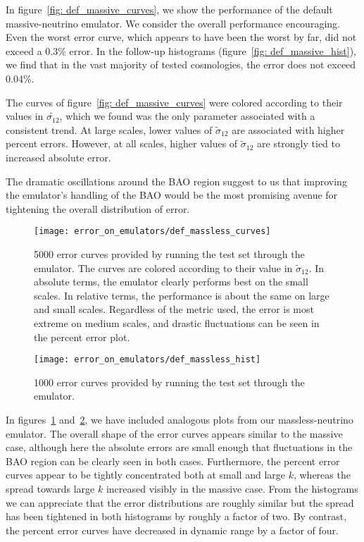 In figure~\ref{fig: def_massive_curves}, we 
show the performance of the default massive-neutrino emulator. We consider
the overall performance encouraging. Even the worst error curve, which
appears to have been the worst by far, did not exceed a 0.3\% error.
In the follow-up histograms (figure~\ref{fig: def_massive_hist}), we find
that in the vast majority of tested cosmologies, the error does not
exceed 0.04\%.

The curves of figure~\ref{fig: def_massive_curves} were colored according to
their values in $\tilde{\sigma_{12}}$, which we found was the only parameter
associated with a consistent trend. At large scales, lower values of
$\tilde{\sigma}_{12}$ are associated with higher percent errors. However, at
all scales, higher values of $\tilde{\sigma}_{12}$ are strongly tied to
increased absolute error.

The dramatic
oscillations around the BAO region suggest to us that improving the emulator's
handling of the BAO would be the most promising avenue for tightening the
overall distribution of error.

\begin{figure}[ht!]
  \centering
  \texttt{[image: error\_on\_emulators/def\_massless\_curves]}
  \caption[Default Massless Emulator Error Curves]{5000 error curves provided 
  by running the test set through the emulator. The curves are colored
  according to their value in $\tilde{\sigma}_{12}$.
  In absolute terms, the emulator
  clearly performs best on the small scales. In relative terms, the
  performance is about the same on large and small scales.
  Regardless of the metric used, the
  error is most extreme on medium scales, and drastic fluctuations can be seen 
  in the percent error plot.}
  \label{fig: def_massless_curves}
\end{figure}

\begin{figure}[ht!]
  \centering
  \texttt{[image: error\_on\_emulators/def\_massless\_hist]}
  \caption[Default Massless Emulator Error Histograms]{1000 error curves provided by running the test set through the emulator.}
  \label{fig: def_massless_hist}
\end{figure}

In figures~\ref{fig: def_massless_curves} and~\ref{fig: def_massless_hist},
we have included analogous plots from our massless-neutrino emulator.
The overall shape of the error curves appears similar to the massive
case, although here the absolute errors are small enough that fluctuations
in the BAO region can be clearly seen in both cases. Furthermore, the
percent error curves appear to be tightly concentrated both at small and
large $k$, whereas the spread towards large $k$ increased visibly
in the massive case. From the histograms we can appreciate that the error
distributions are roughly similar but the spread has been tightened in both
histograms by roughly a factor of two. By contrast, the percent error
curves have decreased in dynamic range by a factor of four.

